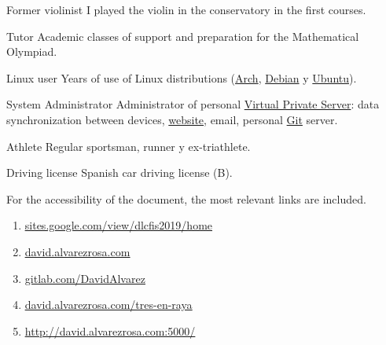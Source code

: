 

\cvachievement{\faMusic}
{Former violinist \smallskip}
{\small {}%
  \small{}}
I played the violin in the conservatory in the first courses.

\divider

\cvachievement{\faGroup}
{Tutor \smallskip}
{Academic classes of support and preparation for the Mathematical Olympiad.}

\divider

\cvachievement{\faLinux}
{Linux user \smallskip}
{Years of use of Linux distributions (\href{https://www.archlinux.org/}{Arch},
\href{https://www.debian.org/}{Debian} y \href{https://ubuntu.com/}{Ubuntu}).}

\divider

\cvachievement{\faServer}
{System Administrator}
{Administrator of personal
\href{https://en.wikipedia.org/wiki/Virtual_private_server}{Virtual Private
Server}: data synchronization between devices,
\href{https://david.alvarezrosa.com}{website\footnotemark}, email, personal
\href{https://en.wikipedia.org/wiki/Git}{Git} server.}

\divider

\cvachievement{\faHeartbeat}
{Athlete \smallskip}
{Regular sportsman, runner y ex-triathlete.}

\divider

\cvachievement{\faCar}
{Driving license \smallskip}
{\small {}%
  \small{}}
Spanish car driving license (B).


\medskip

For the accessibility of the document, the most relevant links are included. \\[1.25ex]
\begin{enumerate}
  \item \href{https://sites.google.com/view/dlcfis2019/home}
  {\underline{sites.google.com/view/dlcfis2019/home}}
  \item \href{https://david.alvarezrosa.com}{\underline{david.alvarezrosa.com}}
  \item \href{https://gitlab.com/DavidAlvarez}
  {\underline{gitlab.com/DavidAlvarez}}
  \item \href{https://david.alvarezrosa.com/tres-en-raya}
  {\underline{david.alvarezrosa.com/tres-en-raya}}
  \item \href{http://david.alvarezrosa.com:5000/}
  {\underline{http://david.alvarezrosa.com:5000/}}
\end{enumerate}
